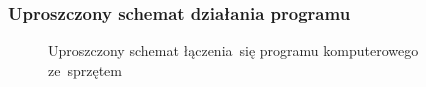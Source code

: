 \documentclass[10pt,t]{beamer}
\begin{document}
\begin{frame}
  \frametitle{Uproszczony schemat działania programu}


  \begin{figure}

    \label{fig:Scheme-of-CPU}



    \caption{Uproszczony schemat łączenia~się programu komputerowego
      ze~sprzętem}


  \end{figure}

\end{frame}
\end{document}
